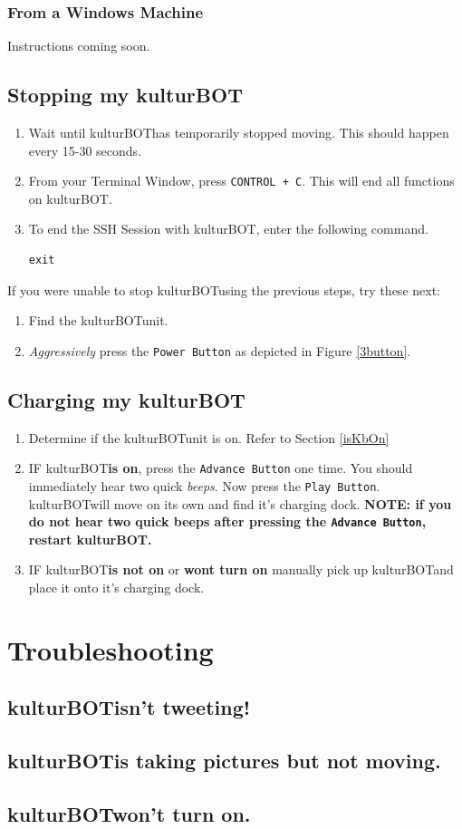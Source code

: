 \documentclass[]{article}
\newcommand{\kb}{kulturBOT}
\newcommand{\kbspace}{\kb \space}
\newcommand{\mykb}{my \kb}
\begin{document}
\subsubsection{From a Windows Machine}

Instructions coming soon.

\subsection{Stopping \mykb}

\begin{enumerate}
\item Wait until \kbspace has temporarily stopped moving. This should happen every 15-30 seconds.
\item From your Terminal Window, press \texttt{CONTROL + C}. This will end all functions on \kb.
\item To end the SSH Session with \kb, enter the following command.

\begin{lstlisting}[style=ssh]
exit
\end{lstlisting}

\end{enumerate}

If you were unable to stop \kbspace using the previous steps, try these next:

\begin{enumerate}
\item Find the \kbspace unit.
\item \textit{Aggressively} press the \texttt{Power Button} as depicted in Figure \ref{3button}.
\end{enumerate}

\subsection{Charging \mykb}
\label{chargingKB}

\begin{enumerate}
\item Determine if the \kb unit is on. Refer to Section \ref{isKbOn}
\item IF \kbspace \textbf{is on}, press the \texttt{Advance Button} one time. You should immediately hear two quick \textit{beeps}. Now press the \texttt{Play Button}. \kbspace will move on its own and find it's charging dock.
\subitem \textbf{NOTE: if you do not hear two quick beeps after pressing the \texttt{Advance Button}, restart \kb.}
\item IF \kbspace \textbf{is not on} or \textbf{wont turn on} manually pick up \kbspace and place it onto it's charging dock.
\end{enumerate}

\section{Troubleshooting}
\subsection{\kbspace isn't tweeting!}
\label{kbNoTweet}

\subsection{\kbspace is taking pictures but not moving.}
\subsection{\kbspace won't turn on.}
\end{document}
